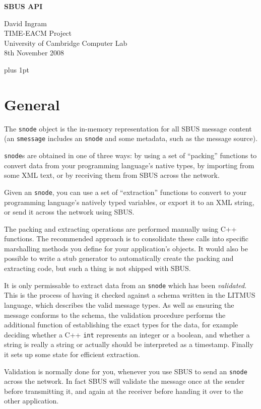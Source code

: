 \documentclass[12pt,a4paper,twoside]{article}
\renewcommand{\_}{\texttt{\symbol{95}}}
\begin{document}
\centerline{\textbf{\LARGE SBUS API}}
\begin{center} \large
David Ingram\\
TIME-EACM Project\\
University of Cambridge Computer Lab\\
8th November 2008\\
\end{center}

{ \parskip 1mm plus 1pt \tableofcontents }
\pagestyle{fancy}

\section{General}

The \verb^snode^ object is the in-memory representation
for all SBUS message content (an \verb^smessage^ includes
an \verb^snode^ and some metadata, such as the message source).

\verb^snode^s are obtained in one of three ways: by using a
set of ``packing'' functions to convert data from your programming
language's native types, by importing from some XML text, or by receiving
them from SBUS across the network.

Given an \verb^snode^, you can use a set of ``extraction''
functions to convert to your programming language's natively
typed variables, or export it to an XML string, or send it
across the network using SBUS.

The packing and extracting operations are
performed manually using C++ functions. The recommended approach is to
consolidate these calls into specific marshalling methods you define
for your application's objects. It would also be possible to write
a stub generator to automatically create the packing and extracting
code, but such a thing is not shipped with SBUS.

It is only permissable to extract data from an \verb^snode^ which has
been \textit{validated}. This is the process of having it checked
against a schema written in the LITMUS language, which describes
the valid message types.
As well as ensuring the message conforms to the schema, the validation
procedure performs the additional function of establishing the exact
types for the data, for example deciding whether a C++
\verb^int^ represents an integer or a boolean, and whether a string
is really a string or actually should be interpreted as a timestamp.
Finally it sets up some state for efficient extraction.

Validation is normally done for you, whenever you use SBUS to send an
\verb^snode^ across the network. In fact SBUS will validate the
message once at the sender before transmitting it, and again at the
receiver before handing it over to the other application.
\end{document}
